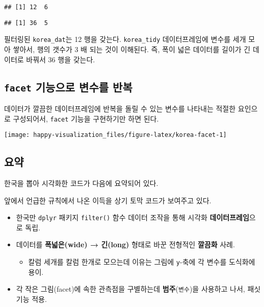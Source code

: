 \documentclass[
]{book}
\providecommand{\tightlist}{%
  \setlength{\itemsep}{0pt}\setlength{\parskip}{0pt}}
\begin{document}
\begin{verbatim}
## [1] 12  6
\end{verbatim}

\begin{verbatim}
## [1] 36  5
\end{verbatim}

필터링된 \texttt{korea\_dat}는 12 행을 갖는다.
\texttt{korea\_tidy} 데이터프레임에 변수를 세개 모아 쌓아서, 행의 갯수가 3 배 되는 것이 이해된다.
즉, 폭이 넓은 데이터를 길이가 긴 데이터로 바꿔서 36 행을 갖는다.

\hypertarget{viz-secret-case-study-facet}{%
\subsection{\texorpdfstring{\texttt{facet} 기능으로 변수를 반복}{facet 기능으로 변수를 반복}}\label{viz-secret-case-study-facet}}

데이터가 깔끔한 데이터프레임에 반복을 돌릴 수 있는 변수를 나타내는 적절한 요인으로 구성되어서,
\texttt{facet} 기능을 구현하기만 하면 된다.

\begin{center}\texttt{[image: happy-visualization\_files/figure-latex/korea-facet-1]} \end{center}

\hypertarget{viz-secret-summary}{%
\subsection{요약}\label{viz-secret-summary}}

한국을 뽑아 시각화한 코드가 다음에 요약되어 있다.

앞에서 언급한 규칙에서 나온 이득을 상기 토막 코드가 보여주고 있다.

\begin{itemize}
\tightlist
\item
  한국만 \texttt{dplyr} 패키지 \texttt{filter()} 함수 데이터 조작을 통해 시각화 \textbf{데이터프레임}으로 독립.
\item
  데이터를 \textbf{폭넓은(wide) → 긴(long)} 형태로 바꾼 전형적인 \textbf{깔끔화} 사례.

  \begin{itemize}
  \tightlist
  \item
    칼럼 세개를 칼럼 한개로 모으는데 이유는 그림에 \texttt{y}-축에 각 변수를 도식화에 용이.
  \end{itemize}
\item
  각 작은 그림(facet)에 속한 관측점을 구별하는데 \textbf{범주}(\texttt{변수})을 사용하고 나서, 패싯 기능 적용.
\end{itemize}
\end{document}
